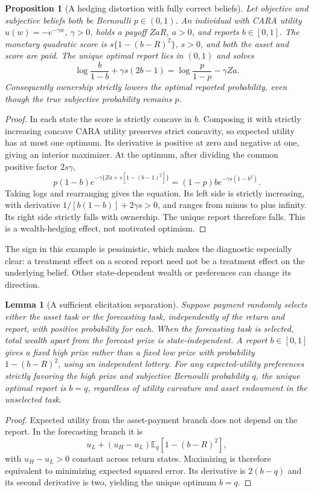 \documentclass[11pt,a4paper]{article}
\newtheorem{proposition}[theorem]{Proposition}
\newtheorem{lemma}[theorem]{Lemma}
\theoremstyle{definition}
\theoremstyle{remark}
\newcommand{\E}{\mathbb E}
\begin{document}
\begin{proposition}[A hedging distortion with fully correct beliefs]\label{pr:hedge}
Let objective and subjective beliefs both be Bernoulli $p\in(0,1)$. An individual with CARA utility $u(w)=-e^{-\gamma w}$, $\gamma>0$, holds a payoff $ZaR$, $a>0$, and reports $b\in[0,1]$. The monetary quadratic score is $s\{1-(b-R)^2\}$, $s>0$, and both the asset and score are paid. The unique optimal report lies in $(0,1)$ and solves
\[
 \log\frac{b}{1-b}+\gamma s(2b-1)
       =\log\frac p{1-p}-\gamma Za.
\]
Consequently ownership strictly lowers the optimal reported probability, even though the true subjective probability remains $p$.
\end{proposition}
\begin{proof}
In each state the score is strictly concave in $b$. Composing it with strictly increasing concave CARA utility preserves strict concavity, so expected utility has at most one optimum. Its derivative is positive at zero and negative at one, giving an interior maximizer. At the optimum, after dividing the common positive factor $2s\gamma$,
\[
 p(1-b)e^{-\gamma\{Za+s[1-(b-1)^2]\}}
 =(1-p)b e^{-\gamma s(1-b^2)}.
\]
Taking logs and rearranging gives the equation. Its left side is strictly increasing, with derivative $1/[b(1-b)]+2\gamma s>0$, and ranges from minus to plus infinity. Its right side strictly falls with ownership. The unique report therefore falls. This is a wealth-hedging effect, not motivated optimism.
\end{proof}

The sign in this example is pessimistic, which makes the diagnostic especially clear: a treatment effect on a scored report need not be a treatment effect on the underlying belief. Other state-dependent wealth or preferences can change its direction.

\begin{lemma}[A sufficient elicitation separation]\label{le:score}
Suppose payment randomly selects either the asset task or the forecasting task, independently of the return and report, with positive probability for each. When the forecasting task is selected, total wealth apart from the forecast prize is state-independent. A report $b\in[0,1]$ gives a fixed high prize rather than a fixed low prize with probability $1-(b-R)^2$, using an independent lottery. For any expected-utility preferences strictly favoring the high prize and subjective Bernoulli probability $q$, the unique optimal report is $b=q$, regardless of utility curvature and asset endowment in the unselected task.
\end{lemma}
\begin{proof}
Expected utility from the asset-payment branch does not depend on the report. In the forecasting branch it is
\[
 u_L+(u_H-u_L)\E_q[1-(b-R)^2],
\]
with $u_H-u_L>0$ constant across return states. Maximizing is therefore equivalent to minimizing expected squared error. Its derivative is $2(b-q)$ and its second derivative is two, yielding the unique optimum $b=q$.
\end{proof}
\end{document}
